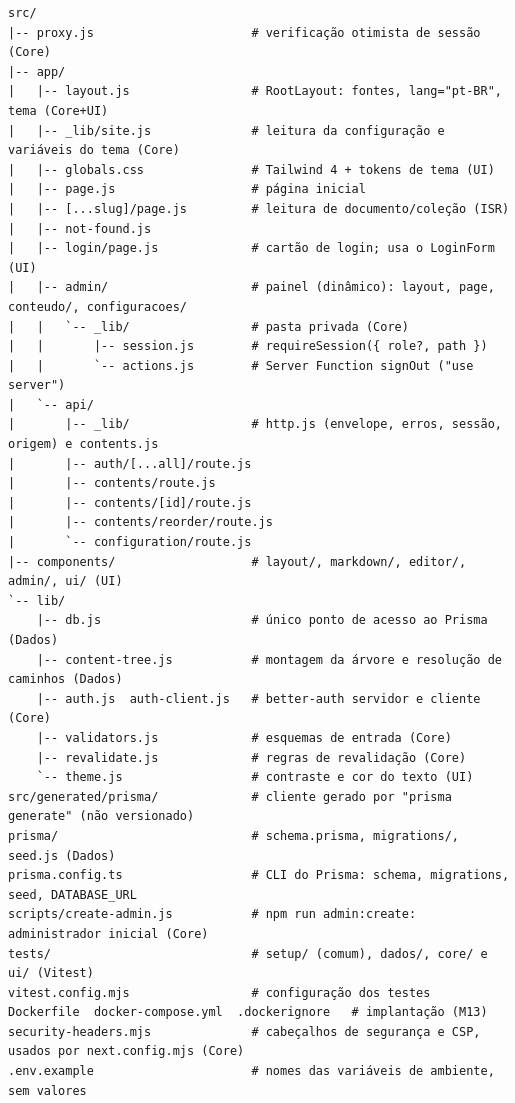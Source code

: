 \begin{lstlisting}[caption={Estrutura-alvo do código (normativa)}, label={lst:arvore-alvo}]
src/
|-- proxy.js                      # verificação otimista de sessão (Core)
|-- app/
|   |-- layout.js                 # RootLayout: fontes, lang="pt-BR", tema (Core+UI)
|   |-- _lib/site.js              # leitura da configuração e variáveis do tema (Core)
|   |-- globals.css               # Tailwind 4 + tokens de tema (UI)
|   |-- page.js                   # página inicial
|   |-- [...slug]/page.js         # leitura de documento/coleção (ISR)
|   |-- not-found.js
|   |-- login/page.js             # cartão de login; usa o LoginForm (UI)
|   |-- admin/                    # painel (dinâmico): layout, page, conteudo/, configuracoes/
|   |   `-- _lib/                 # pasta privada (Core)
|   |       |-- session.js        # requireSession({ role?, path })
|   |       `-- actions.js        # Server Function signOut ("use server")
|   `-- api/
|       |-- _lib/                 # http.js (envelope, erros, sessão, origem) e contents.js
|       |-- auth/[...all]/route.js
|       |-- contents/route.js
|       |-- contents/[id]/route.js
|       |-- contents/reorder/route.js
|       `-- configuration/route.js
|-- components/                   # layout/, markdown/, editor/, admin/, ui/ (UI)
`-- lib/
    |-- db.js                     # único ponto de acesso ao Prisma (Dados)
    |-- content-tree.js           # montagem da árvore e resolução de caminhos (Dados)
    |-- auth.js  auth-client.js   # better-auth servidor e cliente (Core)
    |-- validators.js             # esquemas de entrada (Core)
    |-- revalidate.js             # regras de revalidação (Core)
    `-- theme.js                  # contraste e cor do texto (UI)
src/generated/prisma/             # cliente gerado por "prisma generate" (não versionado)
prisma/                           # schema.prisma, migrations/, seed.js (Dados)
prisma.config.ts                  # CLI do Prisma: schema, migrations, seed, DATABASE_URL
scripts/create-admin.js           # npm run admin:create: administrador inicial (Core)
tests/                            # setup/ (comum), dados/, core/ e ui/ (Vitest)
vitest.config.mjs                 # configuração dos testes
Dockerfile  docker-compose.yml  .dockerignore   # implantação (M13)
security-headers.mjs              # cabeçalhos de segurança e CSP, usados por next.config.mjs (Core)
.env.example                      # nomes das variáveis de ambiente, sem valores
\end{lstlisting}


